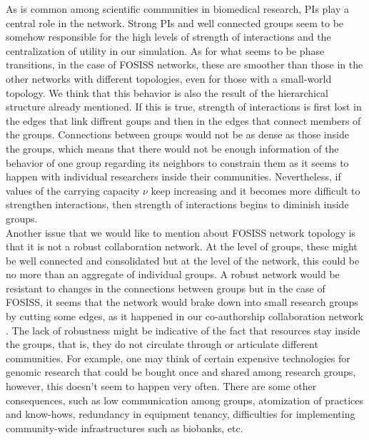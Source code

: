 \documentclass[11pt]{article}
\begin{document}
{{\color{red}As is common among scientific communities in biomedical
  research, PIs play a central role in the network. Strong PIs and
  well connected groups seem to be somehow responsible for the high
  levels of strength of interactions and the centralization of utility
  in our simulation. As for what seems to be phase transitions, in the
  case of FOSISS networks, these are smoother than those in the other
  networks with different topologies, even for those with a
  small-world topology. We think that this behavior is also the result
  of the hierarchical structure already mentioned. If this is true,
  strength of interactions is first lost in the edges that link
  diffrent goups and then in the edges that connect members of the
  groups. Connections between groups would not be as dense as those
  inside the groups, which means that there would not be enough
  information of the behavior of one group regarding its neighbors to
  constrain them as it seems to happen with individual researchers
  inside their communities. Nevertheless, if values of the carrying
  capacity $\nu$ keep increasing and it becomes more difficult to
  strengthen interactions, then strength of interactions begins to
  diminish inside groups.}\\

{\color{red}Another issue that we would like to mention about FOSISS
  network topology is that it is not a robust collaboration network.
  At the level of groups, these might be well connected and
  consolidated but at the level of the network, this could be no more
  than an aggregate of individual groups. A robust network would be
  resistant to changes in the connections between groups but in the
  case of FOSISS, it seems that the network would brake down into
  small research groups by cutting some edges, as it happened in our
  co-authorship collaboration network \cite{HernandezLemus2013}. The
  lack of robustness might be indicative of the fact that resources
  stay inside the groups, that is, they do not circulate through or
  articulate different communities. For example, one may think of
  certain expensive technologies for genomic research that could be
  bought once and shared among research groups, however, this doesn't
  seem to happen very often. There are some other consequences, such
  as low communication among groups, atomization of practices and
  know-hows, redundancy in equipment tenancy, difficulties for
  implementing community-wide infrastructures such as biobanks,
  etc.}\\

}
\end{document}
